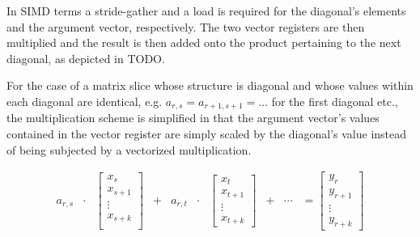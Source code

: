\documentclass{article}
\begin{document}
      In SIMD terms a stride-gather and a load is required for the diagonal's elements and the argument vector, respectively. The two vector registers are then multiplied and the result is then added onto the product pertaining to the next diagonal, as depicted in TODO.

      For the case of a matrix slice whose structure is diagonal and whose values within each diagonal are identical, e.g. $a_{r,s} = a_{r+1, s+1} = \ldots$ for the first diagonal etc., the multiplication scheme is simplified in that the argument vector's values contained in the vector register are simply scaled by the diagonal's value instead of being subjected by a vectorized multiplication.

      \begin{equation}
        \begin{matrix}
          a_{r,s} & \cdot & \begin{bmatrix}
                                    x_s      \\
                                    x_{s+1}  \\
                                      \vdots \\
                                    x_{s+k}  \\
          \end{bmatrix} & + & a_{r,t} & \cdot & \begin{bmatrix}
                                                x_t \\
                                                x_{t+1} \\
                                                \vdots \\
                                                x_{t+k}
                                                                              \end{bmatrix} & + & \cdots & =  \begin{bmatrix}
                                                                                                                 y_{r} \\
                                                                                                                 y_{r+1} \\
                                                                                                                 \vdots \\
                                                                                                                 y_{r+k}
                                                                                                                \end{bmatrix}
        \end{matrix}
      \end{equation}
\end{document}
